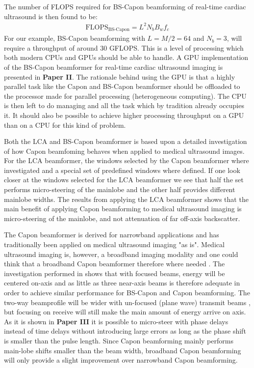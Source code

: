The number of FLOPS required for BS-Capon beamforming of real-time cardiac ultrasound is then found to be:
\begin{align}
\text{FLOPS}_{\text{BS-Capon}} = L^2N_bB_wf_c
\end{align}
For our example, BS-Capon beamforming with $L=M/2=64$ and $N_b=3$, will require a throughput of around $30$ GFLOPS. This is a level of processing which both modern CPUs and GPUs should be able to handle. A GPU implementation of the BS-Capon beamformer for real-time cardiac ultrasound imaging is presented in \textbf{Paper II}. The rationale behind using the GPU is that a highly parallel task like the Capon and BS-Capon beamformer should be offloaded to the processor made for parallel processing (heterogeneous computing). The CPU is then left to do managing and all the task which by tradition already occupies it. It should also be possible to achieve higher processing throughput on a GPU than on a CPU for this kind of problem.

Both the LCA and BS-Capon beamformer is based upon a detailed investigation of how Capon beamfoming behaves when applied to medical ultrasound images. For the LCA beamformer, the windows selected by the Capon beamformer where investigated and a special set of predefined windows where defined. If one look closer at the windows selected for the LCA beamformer we see that half the set performs micro-steering of the mainlobe and the other half provides different mainlobe widths. The results from applying the LCA beamformer shows that the main benefit of applying Capon beamforming to medical ultrasound imaging is micro-steering of the mainlobe, and not attenuation of far off-axis backscatter.

The Capon beamformer is derived for narrowband applications and has traditionally been applied on medical ultrasound imaging "as is". Medical ultrasound imaging is, however, a broadband imaging modality and one could think that a broadband Capon beamformer therefore where needed \cite{Holfort2009}. The investigation performed in \cite{Nilsen2009} shows that with focused beams, energy will be centered on-axis and as little as three near-axis beams is therefore adequate in order to achieve similar performance for BS-Capon and Capon beamforming. The two-way beamprofile will be wider with un-focused (plane wave) transmit beams \cite{Holfort2009, Austeng2011}, but focusing on receive will still make the main amount of energy arrive on axis. As it is shown in \textbf{Paper III} it is possible to micro-steer with phase delays instead of time delays without introducing large errors as long as the phase shift is smaller than the pulse length. Since Capon beamforming mainly performs main-lobe shifts smaller than the beam width, broadband Capon beamforming will only provide a slight improvement over narrowband Capon beamforming.

